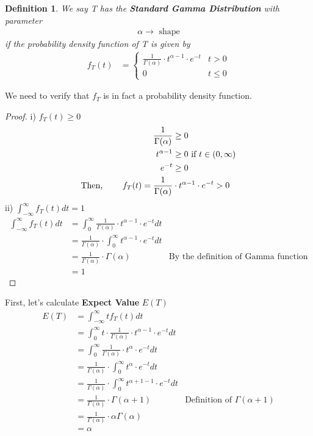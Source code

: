 \documentclass[11pt,oneside]{book}
\theoremstyle{break}
\theoremstyle{break}
\newtheorem{defn}{Definition}[corL]
\begin{document}
\begin{defn}
We say T has the \textbf{Standard Gamma Distribution} with parameter\begin{align*}
\alpha \rightarrow \text{ shape}
\end{align*}
if the probability density function of T is given by \begin{align*}
f_T(t)&=\begin{cases}
\frac{1}{\Gamma(\alpha)}\cdot t^{\alpha -1}\cdot e^{-t}&t>0\\
0&t\leq 0
\end{cases}
\end{align*}
\end{defn}
We need to verify that $f_T$ is in fact a probability density function.\begin{proof}
i) $f_T(t)\geq 0$\begin{align*}
\frac{1}{\Gamma(\alpha)} &\geq 0\\
t^{\alpha-1}&\geq 0 \text{ if } t\in(0,\infty)\\
e^{-t}&\geq 0\\
\text{Then, \qquad }
f_T(t)=\frac{1}{\Gamma(\alpha)}&\cdot t^{\alpha -1}\cdot e^{-t}>0
\end{align*}
ii) $\int_{-\infty}^{\infty}f_T(t)dt=1$\begin{align*}
\int_{-\infty}^{\infty}f_T(t)dt&=\int_{0}^{\infty}\frac{1}{\Gamma(\alpha)}\cdot t^{\alpha -1}\cdot e^{-t}dt\\
&=\frac{1}{\Gamma(\alpha)}\cdot \int_{0}^{\infty}t^{\alpha -1}\cdot e^{-t}dt\\
&=\frac{1}{\Gamma(\alpha)}\cdot \Gamma(\alpha)&\text{By the definition of Gamma function}\\
&=1
\end{align*}
\end{proof}
First, let's calculate \textbf{Expect Value} $E(T)$\begin{align*}
E(T)&=\int_{-\infty}^{\infty}tf_T(t)dt\\
&=\int_{0}^{\infty}t\cdot \frac{1}{\Gamma(\alpha)}\cdot t^{\alpha -1}\cdot e^{-t}dt\\
&=\int_{0}^{\infty} \frac{1}{\Gamma(\alpha)}\cdot t^{\alpha}\cdot e^{-t}dt\\
&= \frac{1}{\Gamma(\alpha)}\cdot \int_{0}^{\infty} t^{\alpha}\cdot e^{-t}dt\\
&= \frac{1}{\Gamma(\alpha)}\cdot \int_{0}^{\infty} t^{\alpha+1-1}\cdot e^{-t}dt\\
&=\frac{1}{\Gamma(\alpha)}\cdot \Gamma(\alpha+1)&\text{Definition of }\Gamma(\alpha+1)\\
&=\frac{1}{\Gamma(\alpha)}\cdot \alpha\Gamma(\alpha)\\
&=\alpha
\end{align*}
\end{document}
